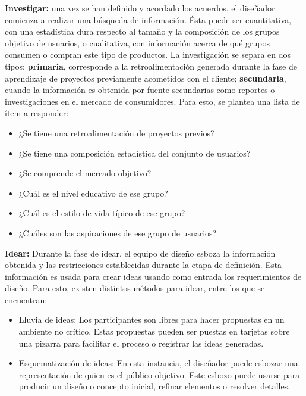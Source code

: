\begin{description}
\item \textbf{Investigar:} una vez se han definido y acordado los acuerdos, el diseñador comienza a realizar una búsqueda de información. Ésta puede ser cuantitativa, con una estadística dura respecto al tamaño y la composición de los grupos objetivo de usuarios, o cualitativa, con información acerca de qué grupos consumen o compran este tipo de productos. La investigación se separa en dos tipos: \textbf{primaria}, corresponde a la retroalimentación generada durante la fase de aprendizaje de proyectos previamente acometidos con el cliente; \textbf{secundaria}, cuando la información es obtenida por fuente secundarias como reportes o investigaciones en el mercado de consumidores. Para esto, se plantea una lista de ítem a responder:
\begin{itemize}
\item ¿Se tiene una retroalimentación de proyectos previos?
\item ¿Se tiene una composición estadística del conjunto de usuarios?
\item ¿Se comprende el mercado objetivo?
\item ¿Cuál es el nivel educativo de ese grupo?
\item ¿Cuál es el estilo de vida típico de ese grupo?
\item ¿Cuáles son las aspiraciones de ese grupo de usuarios?
\end{itemize}


\item \textbf{Idear:} Durante la fase de idear, el equipo de diseño esboza la información obtenida y las restricciones establecidas durante la etapa de definición. Esta información es usada para crear ideas usando como entrada los requerimientos de diseño. Para esto, existen distintos métodos para idear, entre los que se encuentran:
\begin{itemize}
\item Lluvia de ideas: Los participantes son libres para hacer propuestas en un ambiente no crítico. Estas propuestas pueden ser puestas en tarjetas sobre una pizarra para facilitar el proceso o registrar las ideas generadas.
\item Esquematización de ideas: En esta instancia, el diseñador puede esbozar una representación de quien es el público objetivo. Este esbozo puede usarse para producir un diseño o concepto inicial, refinar elementos o resolver detalles.
\end{itemize}


\end{description}

